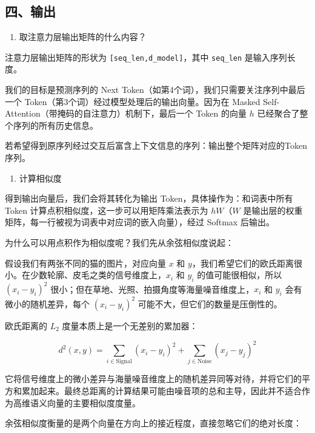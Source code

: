 \hypertarget{ux56dbux8f93ux51fa}{%
\subsection{四、输出}\label{ux56dbux8f93ux51fa}}

\begin{enumerate}
\def\labelenumi{\arabic{enumi}.}
\tightlist
\item
  取注意力层输出矩阵的什么内容？
\end{enumerate}

注意力层输出矩阵的形状为 \texttt{{[}seq\_len,d\_model{]}}，其中 \texttt{seq\_len} 是输入序列长度。

我们的目标是预测序列的 Next Token（如第4个词），我们只需要关注序列中最后一个 Token（第3个词）经过模型处理后的输出向量。因为在 Masked Self-Attention（带掩码的自注意力）机制下，最后一个 Token 的向量 \(h\) 已经聚合了整个序列的所有历史信息。

若希望得到原序列经过交互后富含上下文信息的序列：输出整个矩阵对应的Token序列。

\begin{enumerate}
\def\labelenumi{\arabic{enumi}.}
\setcounter{enumi}{1}
\tightlist
\item
  计算相似度
\end{enumerate}

得到输出向量后，我们会将其转化为输出 Token，具体操作为：和词表中所有 Token 计算点积相似度，这一步可以用矩阵乘法表示为 \(hW\)（\(W\) 是输出层的权重矩阵，每一行被视为词表中对应词的嵌入向量），经过 Softmax 后输出。

为什么可以用点积作为相似度呢？我们先从余弦相似度说起：

假设我们有两张不同的猫的图片，对应向量 \(x\) 和 \(y\)，我们希望它们的欧氏距离很小。在少数轮廓、皮毛之类的信号维度上，\(x_i\) 和 \(y_i\) 的值可能很相似，所以 \((x_i-y_i)^2\) 很小；但在草地、光照、拍摄角度等海量噪音维度上，\(x_i\) 和 \(y_i\) 会有微小的随机差异，每个 \((x_i-y_i)^2\) 可能不大，但它们的数量是压倒性的。

欧氏距离的 \(L_2\) 度量本质上是一个无差别的累加器：

\[
d^2(x,y)=\sum_{i\in\text{Signal}}(x_i-y_i)^2+\sum_{j\in\text{Noise}}(x_j-y_j)^2
\]

它将信号维度上的微小差异与海量噪音维度上的随机差异同等对待，并将它们的平方和累加起来。最终总距离的计算结果可能由噪音项的总和主导，因此并不适合作为高维语义向量的主要相似度度量。

余弦相似度衡量的是两个向量在方向上的接近程度，直接忽略它们的绝对长度：

